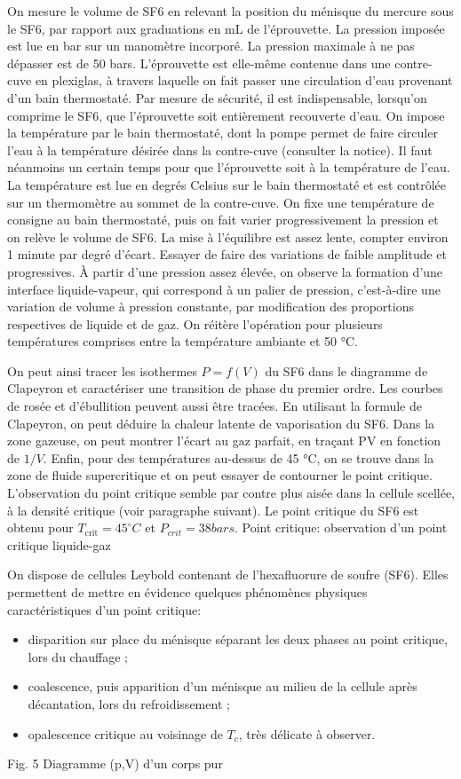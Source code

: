 \documentclass{article}%
\begin{document}
On mesure le volume de SF6 en relevant la position du ménisque du mercure sous le SF6, par rapport aux graduations en mL de l'éprouvette. La pression imposée est lue en bar sur un manomètre incorporé. La pression maximale à ne pas dépasser est de 50 bars. L'éprouvette est elle-même contenue dans une contre-cuve en plexiglas, à travers laquelle on fait passer une circulation d'eau provenant d'un bain thermostaté. Par mesure de sécurité, il est indispensable, lorsqu'on comprime le SF6, que l'éprouvette soit entièrement recouverte d'eau. On impose la température par le bain thermostaté, dont la pompe permet de faire circuler l'eau à la température désirée dans la contre-cuve (consulter la notice). Il faut néanmoins un certain temps pour que l'éprouvette soit à la température de l'eau. La température est lue en degrés Celsius sur le bain thermostaté et est contrôlée sur un thermomètre au sommet de la contre-cuve. On fixe une température de consigne au bain thermostaté, puis on fait varier progressivement la pression et on relève le volume de SF6. La mise à l'équilibre est assez lente, compter environ 1 minute par degré d'écart. Essayer de faire des variations de faible amplitude et progressives. À partir d'une pression assez élevée, on observe la formation d'une interface liquide-vapeur, qui correspond à un palier de pression, c'est-à-dire une variation de volume à pression constante, par modification des proportions respectives de liquide et de gaz. On réitère l'opération pour plusieurs températures comprises entre la température ambiante et 50 °C.

On peut ainsi tracer les isothermes $P=f(V)$ du SF6 dans le diagramme de Clapeyron et caractériser une transition de phase du premier ordre. Les courbes de rosée et d'ébullition peuvent aussi être tracées. En utilisant la formule de Clapeyron, on peut déduire la chaleur latente de vaporisation du SF6. Dans la zone gazeuse, on peut montrer l'écart au gaz parfait, en traçant PV en fonction de $1/V$. Enfin, pour des températures au-dessus de 45 °C, on se trouve dans la zone de fluide supercritique et on peut essayer de contourner le point critique. L'observation du point critique semble par contre plus aisée dans la cellule scellée, à la densité critique (voir paragraphe suivant). Le point critique du SF6 est obtenu pour $T_\mathrm{crit}=45^{\circ} C$ et $P_{crit}=38 bars$.
Point critique: observation d'un point critique liquide-gaz

On dispose de cellules Leybold contenant de l'hexafluorure de soufre (SF6). Elles permettent de mettre en évidence quelques phénomènes physiques caractéristiques d'un point critique:
\begin{itemize}
	\item    disparition sur place du ménisque séparant les deux phases au point critique, lors du chauffage ;
	\item    coalescence, puis apparition d'un ménisque au milieu de la cellule après décantation, lors du refroidissement ;
	\item    opalescence critique au voisinage de $T_{c}$, très délicate à observer.
\end{itemize}
Fig. 5 Diagramme (p,V) d'un corps pur
\end{document}
